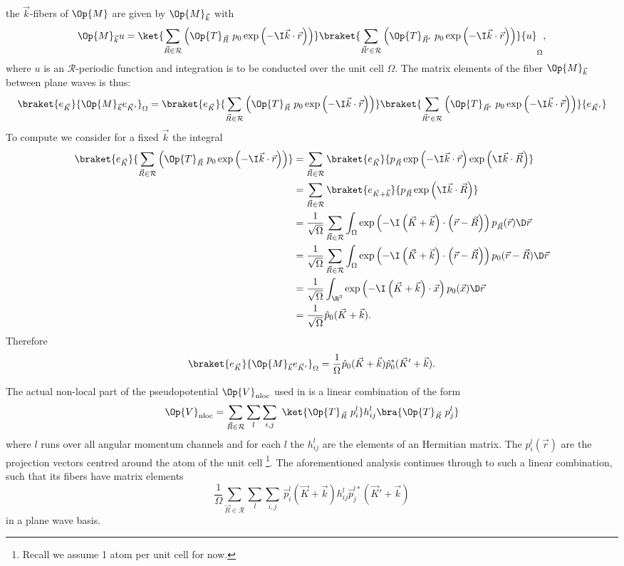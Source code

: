 \documentclass{MFHarticle}
\begin{document}
the $\vec{k}$-fibers of $\Op{M}$ are given by $\Op{M}_{\vec{k}}$ with
\[\Op{M}_{\vec{k}} u =
\ket{
\sum_{\vec{R} \in \mathcal{R}}
\left(
\Op{T}_{\vec{R}}\
p_0 \exp\left(-\I \vec{k} \cdot \vec{r}\right)\right)}
\braket{
\sum_{\vec{R}' \in \mathcal{R}}
\left(
\Op{T}_{\vec{R}'}\
p_0 \exp\left(-\I \vec{k} \cdot \vec{r}\right)\right)}
{u}_\Omega,
\]
where $u$ is an $\mathcal{R}$-periodic function
and integration is to be conducted over the unit cell $\Omega$.
The matrix elements of the fiber $\Op{M}_{\vec{k}}$
between plane waves is thus:
\[
\braket{e_{\vec{K}}}{\Op{M}_{\vec{k}} e_{\vec{K}'}}_\Omega
=
\braket{e_{\vec{K}}}{
\sum_{\vec{R} \in \mathcal{R}}
\left(
\Op{T}_{\vec{R}}\
p_0 \exp\left(-\I \vec{k} \cdot \vec{r}\right)\right)}
\braket{
\sum_{\vec{R}' \in \mathcal{R}}
\left(
\Op{T}_{\vec{R}'}\
p_0 \exp\left(-\I \vec{k} \cdot \vec{r}\right)\right)}
{e_{\vec{K}'}}
\]
To compute we consider for a fixed $\vec{k}$ the integral
\begin{align*}
\braket{e_{\vec{K}}}{
\sum_{\vec{R} \in \mathcal{R}}
\left(
\Op{T}_{\vec{R}}\
p_0 \exp\left(-\I \vec{k} \cdot \vec{r}\right)\right)}
&=
\sum_{\vec{R} \in \mathcal{R}}
\braket{e_{\vec{K}}}{p_{\vec{R}} \exp\left(-\I \vec{k} \cdot \vec{r}\right)
\exp\left(\I \vec{k} \cdot \vec{R}\right)} \\
&=
\sum_{\vec{R} \in \mathcal{R}}
\braket{e_{\vec{K} + \vec{k}}}{p_{\vec{R}}
\exp\left(\I \vec{k} \cdot \vec{R}\right)} \\
&= \frac1{\sqrt{\Omega}}
\sum_{\vec{R} \in \mathcal{R}}
\int_\Omega
\exp\left(-\I \left( \vec{K} + \vec{k} \right)
\cdot \left(\vec{r} - \vec{R}\right)\right)
p_{\vec{R}}(\vec{r}) \D\vec{r} \\
&= \frac1{\sqrt{\Omega}}
\sum_{\vec{R} \in \mathcal{R}}
\int_\Omega
\exp\left(-\I \left( \vec{K} + \vec{k} \right)
\cdot \left(\vec{r} - \vec{R}\right)\right)
p_0(\vec{r} - \vec{R}) \D\vec{r} \\
&= \frac1{\sqrt{\Omega}}
\int_{\R^3}
\exp\left(-\I \left( \vec{K} + \vec{k} \right)
\cdot \vec{x}\right)
p_0(\vec{x}) \D\vec{r} \\
&= \frac1{\sqrt{\Omega}} \hat{p}_0(\vec{K} + \vec{k}).
\end{align*}
Therefore
\[
\braket{e_{\vec{K}}}{\Op{M}_{\vec{k}} e_{\vec{K}'}}_\Omega
=\frac1{\Omega} \hat{p}_0(\vec{K} + \vec{k}) \hat{p}_0^\ast(\vec{K}' + \vec{k}).
\]

The actual non-local part of the pseudopotential
$\Op{V}_\text{nloc}$ used in \cite{Goedecker1996,Hartwigsen1998}
is a linear combination of the form
\[
	\Op{V}_\text{nloc} =
	\sum_{\vec{R} \in \mathcal{R}}
	\sum_{l}
	\sum_{i,j}\
	\ket{\Op{T}_{\vec{R}}\ p_i^l} h_{ij}^l \bra{\Op{T}_{\vec{R}}\ p_j^l}
\]
where $l$ runs over all angular momentum channels and
for each $l$ the $h_{ij}^l$
are the elements of an Hermitian matrix.
The $p_i^l(\vec{r})$ are the projection vectors
centred around the atom of the unit cell%
\footnote{Recall we assume 1 atom per unit cell for now.}.
The aforementioned analysis continues through to such a linear combination,
such that its fibers have matrix elements
\[
	\frac1{\Omega}
	\sum_{\vec{R} \in \mathcal{R}}
	\sum_{l}
	\sum_{i,j}\
	\hat{p}_i^l(\vec{K} + \vec{k})
	h_{ij}^l
	\hat{p}_j^{l\ast}(\vec{K}' + \vec{k})
\]
in a plane wave basis.
\end{document}
